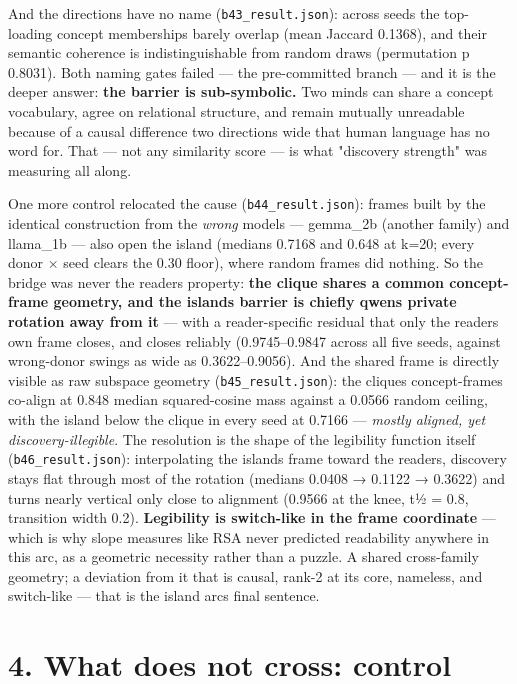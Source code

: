 \documentclass[11pt]{article}
\begin{document}
And the directions have no name (\texttt{b43\_result.json}): across seeds the top-loading concept memberships barely overlap (mean Jaccard 0.1368), and their semantic coherence is indistinguishable from random draws (permutation p 0.8031). Both naming gates failed --- the pre-committed branch --- and it is the deeper answer: \textbf{the barrier is sub-symbolic.} Two minds can share a concept vocabulary, agree on relational structure, and remain mutually unreadable because of a causal difference two directions wide that human language has no word for. That --- not any similarity score --- is what "discovery strength" was measuring all along.

One more control relocated the cause (\texttt{b44\_result.json}): frames built by the identical construction from the \emph{wrong} models --- gemma\_2b (another family) and llama\_1b --- also open the island (medians 0.7168 and 0.648 at k=20; every donor × seed clears the 0.30 floor), where random frames did nothing. So the bridge was never the reader\textquotesingle s property: \textbf{the clique shares a common concept-frame geometry, and the island\textquotesingle s barrier is chiefly qwen\textquotesingle s private rotation away from it} --- with a reader-specific residual that only the reader\textquotesingle s own frame closes, and closes reliably (0.9745--0.9847 across all five seeds, against wrong-donor swings as wide as 0.3622--0.9056). And the shared frame is directly visible as raw subspace geometry (\texttt{b45\_result.json}): the clique\textquotesingle s concept-frames co-align at 0.848 median squared-cosine mass against a 0.0566 random ceiling, with the island below the clique in every seed at 0.7166 --- \emph{mostly aligned, yet discovery-illegible}. The resolution is the shape of the legibility function itself (\texttt{b46\_result.json}): interpolating the island\textquotesingle s frame toward the reader\textquotesingle s, discovery stays flat through most of the rotation (medians 0.0408 → 0.1122 → 0.3622) and turns nearly vertical only close to alignment (0.9566 at the knee, t½ = 0.8, transition width 0.2). \textbf{Legibility is switch-like in the frame coordinate} --- which is why slope measures like RSA never predicted readability anywhere in this arc, as a geometric necessity rather than a puzzle. A shared cross-family geometry; a deviation from it that is causal, rank-2 at its core, nameless, and switch-like --- that is the island arc\textquotesingle s final sentence.

\section{4. What does not cross: control}\label{4-what-does-not-cross-control}
\end{document}
